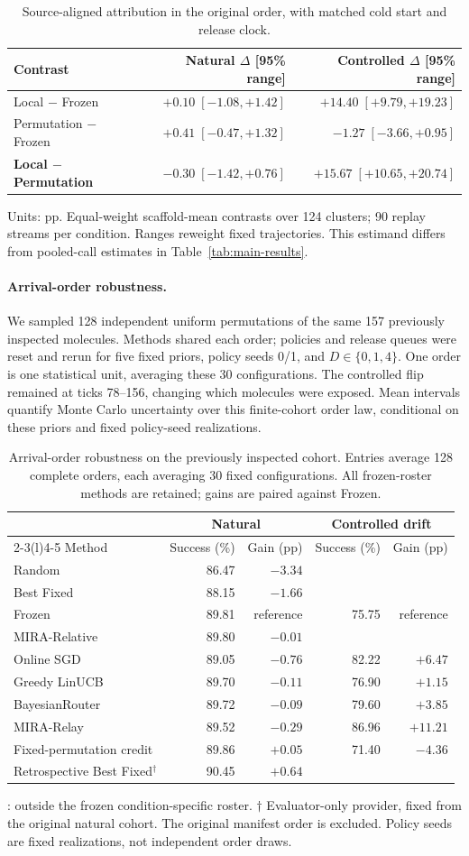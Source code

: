 \documentclass[sigconf,anonymous]{aamas}
\makeatletter
\newcommand{\MiraTableFont}{\fontsize{9}{11}\selectfont}
\newcommand{\tnote}[1]{{\fontsize{8.5}{10}\selectfont\raggedright\par\vspace{3pt}#1\par}}
\newcommand{\notrun}{\textemdash}
\newcommand{\MiraCreditCaption}{Source-aligned attribution in the original order, with matched cold start and release clock.}
\newcommand{\MiraCreditLabels}{\label{tab:credit-ablation}}
\newcommand{\MiraCreditBody}{%
\begingroup\centering\MiraTableFont\setlength{\tabcolsep}{13pt}\renewcommand{\arraystretch}{1.10}
\begin{tabular}{@{}lrr@{}}
\toprule
Contrast & Natural $\Delta$ [95\% range] & Controlled $\Delta$ [95\% range] \\
\midrule
Local $-$ Frozen & $+0.10\;[-1.08,+1.42]$ & $+14.40\;[+9.79,+19.23]$ \\
Permutation $-$ Frozen & $+0.41\;[-0.47,+1.32]$ & $-1.27\;[-3.66,+0.95]$ \\
\textbf{Local $-$ Permutation} & $-0.30\;[-1.42,+0.76]$ & $+15.67\;[+10.65,+20.74]$ \\
\bottomrule
\end{tabular}\par
\tnote{Units: pp. Equal-weight scaffold-mean contrasts over 124 clusters; 90 replay streams per condition. Ranges reweight fixed trajectories. This estimand differs from pooled-call estimates in Table~\ref{tab:main-results}.}
\endgroup}
\makeatother
\begin{document}
\begin{table}[t]
\caption{\MiraCreditCaption}
\MiraCreditLabels
\MiraCreditBody
\end{table}

\paragraph{Arrival-order robustness.}
We sampled 128 independent uniform permutations of the same 157 previously
inspected molecules. Methods shared each order; policies and release queues were
reset and rerun for five fixed priors, policy seeds 0/1, and $D\in\{0,1,4\}$.
One order is one statistical unit, averaging these 30 configurations. The controlled
flip remained at ticks 78--156, changing which molecules were exposed.
Mean intervals quantify Monte Carlo uncertainty over this finite-cohort order law,
conditional on these priors and fixed policy-seed realizations.

\begin{table}[t]
\caption{Arrival-order robustness on the previously inspected cohort.
Entries average 128 complete orders, each averaging 30 fixed configurations.
All frozen-roster methods are retained; gains are paired against Frozen.}
\label{tab:arrival-robustness}
\begingroup\centering\MiraTableFont
\setlength{\tabcolsep}{9pt}\renewcommand{\arraystretch}{1.08}
\begin{tabular}{@{}lrrrr@{}}
\toprule
& \multicolumn{2}{c}{Natural} & \multicolumn{2}{c}{Controlled drift} \\
\cmidrule(lr){2-3}\cmidrule(l){4-5}
Method & Success (\%) & Gain (pp) & Success (\%) & Gain (pp) \\
\midrule
Random & 86.47 & $-3.34$ & \notrun & \notrun \\
Best Fixed & 88.15 & $-1.66$ & \notrun & \notrun \\
Frozen & 89.81 & reference & 75.75 & reference \\
MIRA-Relative & 89.80 & $-0.01$ & \notrun & \notrun \\
\midrule
Online SGD & 89.05 & $-0.76$ & 82.22 & $+6.47$ \\
Greedy LinUCB & 89.70 & $-0.11$ & 76.90 & $+1.15$ \\
BayesianRouter & 89.72 & $-0.09$ & 79.60 & $+3.85$ \\
MIRA-Relay & 89.52 & $-0.29$ & 86.96 & $+11.21$ \\
\midrule
Fixed-permutation credit & 89.86 & $+0.05$ & 71.40 & $-4.36$ \\
\midrule
Retrospective Best Fixed$^{\dagger}$ & 90.45 & $+0.64$ & \notrun & \notrun \\
\bottomrule
\end{tabular}\par
\tnote{\notrun: outside the frozen condition-specific roster.
$\dagger$ Evaluator-only provider, fixed from the original natural cohort.
The original manifest order is excluded. Policy seeds are fixed realizations,
not independent order draws.}
\endgroup
\end{table}
\end{document}
